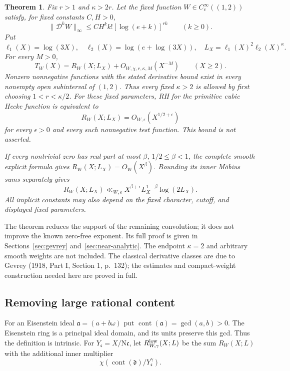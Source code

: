 \documentclass[11pt]{article}
\newtheorem{theorem}{Theorem}[section]
\newcommand{\N}{\mathrm N}
\begin{document}
\begin{theorem}\label{thm:near-analytic-cutoff}
Fix $r>1$ and $\kappa>2r$. Let the fixed function
$W\in C_c^\infty((1,2))$ satisfy, for fixed constants $C,H>0$,
\[
 \|\mathcal D^kW\|_\infty\le C H^k k![\log(e+k)]^{rk}
 \qquad(k\ge0).
\]
Put
\[
 \ell_1(X)=\log(3X),\quad
 \ell_2(X)=\log(e+\log(3X)),\quad
 L_X=\ell_1(X)^2\ell_2(X)^\kappa.
\]
For every $M>0$,
\[
 T_W(X)=R_W(X;L_X)+O_{W,\chi,r,\kappa,M}(X^{-M})
 \qquad(X\ge2).
\]
Nonzero nonnegative functions with the stated derivative bound exist
in every nonempty open subinterval of $(1,2)$. Thus every fixed
$\kappa>2$ is allowed by first choosing $1<r<\kappa/2$.
For these fixed parameters, RH for the primitive cubic Hecke
function is equivalent to
\[
 R_W(X;L_X)=O_{W,\epsilon}(X^{1/2+\epsilon})
\]
for every $\epsilon>0$ and every such nonnegative test function.
This bound is not asserted.

If every nontrivial zero has real part at most
$\beta$, $1/2\le\beta<1$, the complete smooth explicit formula
gives $R_W(X;L_X)=O_W(X^\beta)$. Bounding its inner M\"obius
sums separately gives
\[
 R_W(X;L_X)\ll_{W,\epsilon} X^{\beta+\epsilon}
                    L_X^{1-\beta}\log(2L_X).
\]
All implicit constants may also depend on the fixed character,
cutoff, and displayed fixed parameters.
\end{theorem}
The theorem reduces the support of the remaining convolution;
it does not improve the known zero-free exponent. Its full proof
is given in Sections~\ref{sec:gevrey} and~\ref{sec:near-analytic}.
The endpoint $\kappa=2$ and arbitrary smooth weights are not included.
The classical derivative classes are due to Gevrey
(1918, Part I, Section 1, p.~132); the estimates and compact-weight
construction needed here are proved in full.

\subsection{Removing large rational content}
For an Eisenstein ideal $\mathfrak a=(a+b\omega)$ put
$\operatorname{cont}(\mathfrak a)=\gcd(a,b)>0$.
The Eisenstein ring is a principal ideal domain, and its units
preserve this gcd. Thus the definition is intrinsic.
For $Y_{\mathfrak c}=X/\N\mathfrak c$, let
$R^{\rm low}_{W,\gamma}(X;L)$ be the sum $R_W(X;L)$ with the
additional inner multiplier
\[
 \chi\left(\operatorname{cont}(\mathfrak d)/
                          Y_{\mathfrak c}^{\gamma}\right).
\]
\end{document}
